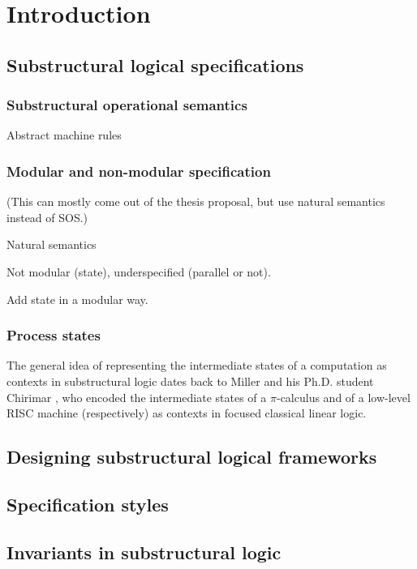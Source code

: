 \chapter{Introduction}
\label{introduction}

\section{Substructural logical specifications}



\subsection{Substructural operational semantics}
\label{sec:intro-ssos}

Abstract machine rules

\subsection{Modular and non-modular specification}
\label{sec:modularnonmodular}

(This can mostly come out of the thesis proposal, but use 
natural semantics instead of SOS.)

Natural semantics

Not modular (state), underspecified (parallel or not).


Add state in a modular way.

\subsection{Process states}

The general idea of representing the
intermediate states of a computation as contexts in substructural
logic dates back to Miller \cite{miller92pi} and his Ph.D. student
Chirimar \cite{chirimar95proof}, who encoded the intermediate states
of a $\pi$-calculus and of a low-level RISC machine (respectively) as
contexts in focused classical linear logic.

\section{Designing substructural logical frameworks}

\section{Specification styles}

\section{Invariants in substructural logic}
